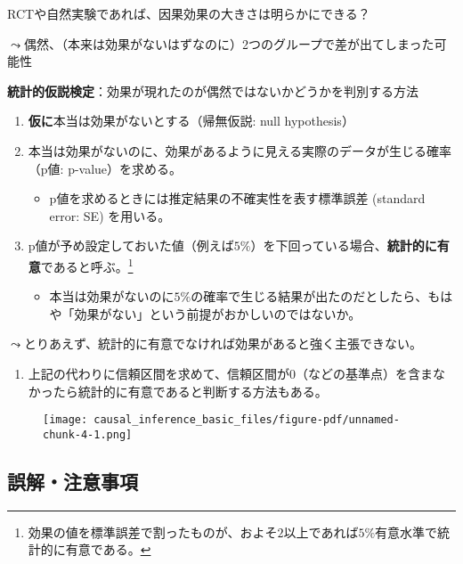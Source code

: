 \documentclass[
  xelatex,
  ja=standard]{bxjsarticle}
\providecommand{\tightlist}{%
  \setlength{\itemsep}{0pt}\setlength{\parskip}{0pt}}\usepackage{longtable,booktabs,array}
\begin{document}
RCTや自然実験であれば、因果効果の大きさは明らかにできる？

\(\leadsto\)偶然、（本来は効果がないはずなのに）2つのグループで差が出てしまった可能性

\textbf{統計的仮説検定}：効果が現れたのが偶然ではないかどうかを判別する方法

\begin{enumerate}
\def\labelenumi{\arabic{enumi}.}
\tightlist
\item
  \textbf{仮に}本当は効果がないとする（帰無仮説: null hypothesis）
\item
  本当は効果がないのに、効果があるように見える実際のデータが生じる確率（p値:
  p-value）を求める。

  \begin{itemize}
  \tightlist
  \item
    p値を求めるときには推定結果の不確実性を表す標準誤差 (standard error:
    SE) を用いる。
  \end{itemize}
\item
  p値が予め設定しておいた値（例えば\(5\%\)）を下回っている場合、\textbf{統計的に有意}であると呼ぶ。\footnote{効果の値を標準誤差で割ったものが、およそ\(2\)以上であれば\(5\%\)有意水準で統計的に有意である。}

  \begin{itemize}
  \tightlist
  \item
    本当は効果がないのに\(5\%\)の確率で生じる結果が出たのだとしたら、もはや「効果がない」という前提がおかしいのではないか。
  \end{itemize}
\end{enumerate}

\(\leadsto\)とりあえず、統計的に有意でなければ効果があると強く主張できない。

\begin{enumerate}
\def\labelenumi{\arabic{enumi}.}
\tightlist
\item
  上記の代わりに信頼区間を求めて、信頼区間が0（などの基準点）を含まなかったら統計的に有意であると判断する方法もある。
\end{enumerate}

\begin{figure}[htpb]

{\centering \texttt{[image: causal\_inference\_basic\_files/figure-pdf/unnamed-chunk-4-1.png]}

}

\end{figure}

\hypertarget{ux8aa4ux89e3ux6ce8ux610fux4e8bux9805}{%
\subsection{誤解・注意事項}\label{ux8aa4ux89e3ux6ce8ux610fux4e8bux9805}}
\end{document}
